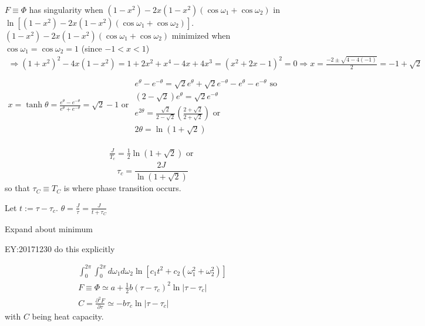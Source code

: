 $F \equiv \Phi$ has singularity when $  (1-x^2) -  2x(1-x^2) \left( \cos{  \omega_1 } + \cos{  \omega_2 } \right)  $ in $\ln{ \left[ (1-x^2) -  2x(1-x^2) \left( \cos{  \omega_1 } + \cos{  \omega_2 } \right) \right]  }$.  \\
$  (1-x^2) -  2x(1-x^2) \left( \cos{  \omega_1 } + \cos{  \omega_2 } \right) $ minimized when $\cos{\omega_1} = \cos{\omega_2}=1$ (since $-1 < x < 1$) 
\[
\begin{gathered}
\Longrightarrow (1+x^2)^2 - 4x(1-x^2 ) = 1+2x^2 + x^4 - 4x + 4x^3 = (x^2+2x-1)^2 =0 \Longrightarrow x = \frac{-2 \pm \sqrt{ 4-4(-1) } }{2} = -1 + \sqrt{2} \\
x = \tanh{\theta} = \frac{e^{\theta} - e^{-\theta} }{ e^{\theta} + e^{-\theta} } = \sqrt{2}  -1 \text{ or } \begin{gathered}
\qquad \\ e^{\theta} - e^{-\theta} = \sqrt{2} e^{\theta} + \sqrt{2} e^{-\theta} - e^{\theta} - e^{-\theta} \text{ so } \\ 
(2-\sqrt{2}) e^{\theta} = \sqrt{2} e^{-\theta} \\
e^{2\theta} = \frac{\sqrt{2}}{ 2-\sqrt{2}} \left( \frac{2+\sqrt{2} }{ 2 + \sqrt{2}} \right) \text{ or } \\ 
2\theta = \ln{ (1+ \sqrt{2})}
\end{gathered}
\end{gathered}
\]

\[
\begin{gathered}
\frac{J}{T_c} = \frac{1}{2} \ln{ (1+\sqrt{2})} \text{ or } 
\end{gathered}
\]
\begin{equation}
\boxed{ \tau_c = \frac{2J}{ \ln{ (1+\sqrt{2}) }} }
\end{equation}
so that $\tau_C \equiv T_C$ is where phase transition occurs.  

Let $t:= \tau - \tau_c$.  $\theta = \frac{J}{\tau} = \frac{J}{t+\tau_C}$  

Expand about minimum  

EY:20171230 do this explicitly 

\[
\begin{gathered}
\int_0^{2\pi } \int_0^{2\pi} d\omega_1 d\omega_2 \ln{ [ c_1 t^2 + c_2(\omega_1^2 + \omega_2^2 )]} \\ 
F  \equiv \Phi \simeq a + \frac{1}{2} b (\tau-\tau_c)^2 \ln{ |\tau-\tau_c|} \\ 
C = \frac{ \partial^2 F}{ \partial \tau } \simeq - b\tau_c \ln{ |\tau-\tau_c| }
\end{gathered}
\]
with $C$ being heat capacity.  

